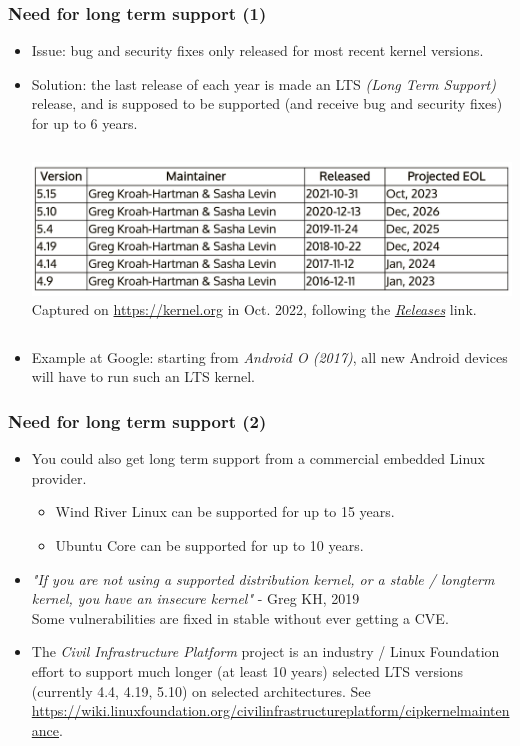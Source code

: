 \begin{frame}[fragile]
  \frametitle{Need for long term support (1)}
  \begin{itemize}
  \item Issue: bug and security fixes only released for most recent
    kernel versions.
  \item Solution: the last release of each year is made an LTS {\em (Long Term
     Support)} release, and is supposed to be supported (and receive bug
    and security fixes) for up to 6 years.
  \begin{columns}
  \includegraphics[width=\textwidth]{common/long-term-support-kernels.png}\\
  \scriptsize
   Captured on \url{https://kernel.org} in Oct. 2022, following the
   \href{https://www.kernel.org/category/releases.html}{\em Releases} link.
  \end{columns}
  \item Example at Google: starting from {\em Android O (2017)}, all new Android devices will
    have to run such an LTS kernel.
  \end{itemize}
\end{frame}

\begin{frame}[fragile]
  \frametitle{Need for long term support (2)}
  \begin{itemize}
  \item You could also get long term support from a commercial embedded
    Linux provider.
    \begin{itemize}
	\item Wind River Linux can be supported for up to 15 years.
	\item Ubuntu Core can be supported for up to 10 years.
    \end{itemize}
  \item {\em "If you are not using a supported distribution kernel, or a stable / longterm
    kernel, you have an insecure kernel"} - Greg KH, 2019\\
    Some vulnerabilities are fixed in stable without ever getting a CVE.
  \item The {\em Civil Infrastructure Platform} project is an industry /
    Linux Foundation effort to support much longer (at least 10 years)
    selected LTS versions (currently 4.4, 4.19, 5.10) on selected architectures.
    See \url{https://wiki.linuxfoundation.org/civilinfrastructureplatform/cipkernelmaintenance}.
  \end{itemize}
\end{frame}
